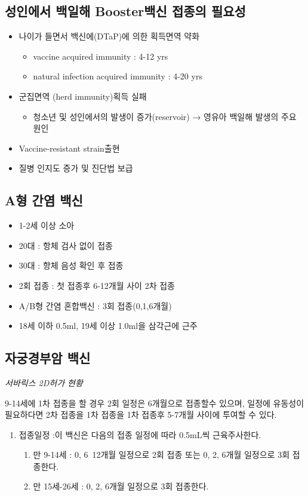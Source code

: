 \subsection{성인에서 백일해 Booster백신 접종의 필요성}
\begin{itemize}\tightlist
\item 나이가 들면서 백신에(DTaP)에 의한 획득면역 약화
	\begin{itemize}\tightlist
	\item vaccine acquired immunity : 4-12 yrs
	\item natural infection acquired immunity : 4-20 yrs
	\end{itemize}
\item 군집면역 (herd immunity)획득 실패
	\begin{itemize}\tightlist
	\item 청소년 및 성인에서의 발생이 증가(reservoir) → 영유아 백일해 발생의 주요 원인
	\end{itemize}
\item Vaccine-resistant strain출현
\item 질병 인지도 증가 및 진단법 보급
\end{itemize}

\subsection{A형 간염 백신}
\begin{itemize}\tightlist
\item 1-2세 이상 소아
\item 20대 : 항체 검사 없이 접종
\item 30대 : 항체 음성 확인 후 접종
\item 2회 접종 : 첫 접종후 6-12개월 사이 2차 접종
\item A/B형 간염 혼합백신 : 3회 접종(0,1,6개월)
\item 18세 이하 0.5ml, 19세 이상 1.0ml을 삼각근에 근주
\end{itemize}

\subsection{자궁경부암 백신}
\emph{서바릭스 2D허가 현황}\par
9-14세에 1차 접종을 할 경우 2회 일정은 6개월으로 접종할수 있으며, 일정에 유동성이 필요하다면 2차 접종을 1차 접종을 1차 접종후 5-7개월 사이에 투여할 수 있다.

\par%
\begin{enumerate}[1.]\tightlist
\item 접종일정 :이 백신은 다음의 접종 일정에 따라 0.5mL씩 근육주사한다. 

	\begin{enumerate}[(1)]\tightlist
	\item 만 9-14세 : 0, 6~12개월 일정으로 2회 접종 또는 0, 2, 6개월 일정으로 3회 접종한다. 
	\item 만 15세-26세 : 0, 2, 6개월 일정으로 3회 접종한다. 
	\end{enumerate}
\end{enumerate}
	
